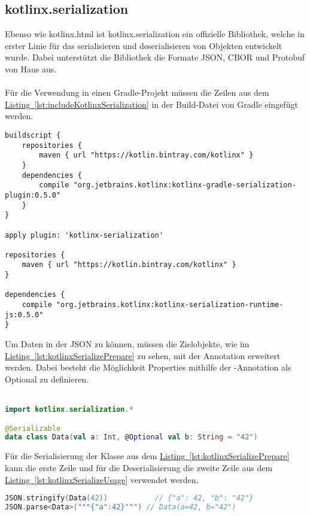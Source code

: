 \subsection{kotlinx.serialization}\label{sec:kotlinxSerialization}
Ebenso wie kotlinx.html ist kotlinx.serialization \cite{kotlinxSerialization} ein offizielle Bibliothek, welche in erster Linie für das serialisieren und deserialisieren von Objekten entwickelt wurde. Dabei unterstützt die Bibliothek die Formate \gls{JSON}, \gls{CBOR} und \gls{Protobuf} von Haus aus.\\
\\
Für die Verwendung in einen Gradle-Projekt müssen die Zeilen aus dem \hyperref[lst:includeKotlinxSerialization]{Listing~\ref{lst:includeKotlinxSerialization}} in der Build-Datei von Gradle eingefügt werden.
\begin{lstlisting}[style=lstStyleFramed, language=Gradle, caption={Einbindung der Bibliothek kotlinx.serialization mithilfe von Gradle}, label=lst:includeKotlinxSerialization, float]
buildscript {
	repositories {
		maven { url "https://kotlin.bintray.com/kotlinx" }
	}
	dependencies {
		compile "org.jetbrains.kotlinx:kotlinx-gradle-serialization-plugin:0.5.0"
	}
}

apply plugin: 'kotlinx-serialization'

repositories {
	maven { url "https://kotlin.bintray.com/kotlinx" }
}

dependencies {
	compile "org.jetbrains.kotlinx:kotlinx-serialization-runtime-js:0.5.0"
}
\end{lstlisting}
Um Daten in der \gls{JSON} zu können, müssen die Zielobjekte, wie im \hyperref[lst:kotlinxSerializePrepare]{Listing~\ref{lst:kotlinxSerializePrepare}} zu sehen, mit der Annotation  erweitert werden. Dabei besteht die Möglichkeit Properties mithilfe der -Annotation als Optional zu definieren.\\
\\
\begin{lstlisting}[style=lstStyleFramed, language=Kotlin, caption={Beispiel: Model-Erweiterung für Unterstützung der Kotlinx.serialization Bibliothek (verändert nach \cite{kotlinxSerializationExample})}, label=lst:kotlinxSerializePrepare, float]
import kotlinx.serialization.*

@Serializable
data class Data(val a: Int, @Optional val b: String = "42")
\end{lstlisting}
Für die Serialisierung der Klasse  aus dem
\hyperref[lst:kotlinxSerializePrepare]{Listing~\ref{lst:kotlinxSerializePrepare}} kann die erste Zeile und für die Deserialisierung die zweite Zeile aus dem \hyperref[lst:kotlinxSerializeUsage]{Listing~\ref{lst:kotlinxSerializeUsage}} verwendet werden.
\begin{lstlisting}[style=lstStyleFramed, language=Kotlin, caption={Beispiel: Serializierung und Deserialisierung der \code{Data} Klasse (verändert nach \cite{kotlinxSerializationExample})}, label=lst:kotlinxSerializeUsage, float]
JSON.stringify(Data(42))   		   // {"a": 42, "b": "42"}
JSON.parse<Data>("""{"a":42}""") // Data(a=42, b="42")
\end{lstlisting}

